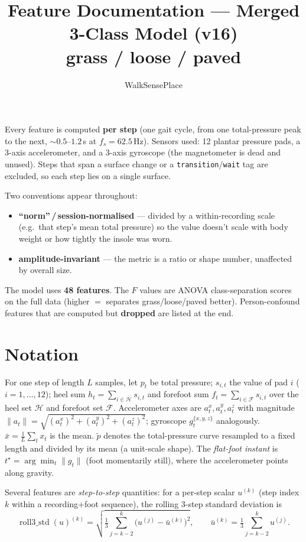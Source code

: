 \documentclass[11pt]{article}
\title{\textbf{Feature Documentation — Merged 3-Class Model (v16)}\\[2pt]
\large grass / loose / paved}
\author{WalkSensePlace}
\date{}
\newcommand{\code}[1]{\texttt{#1}}
\begin{document}
\maketitle

Every feature is computed \textbf{per step} (one gait cycle, from one total-pressure peak to the
next, ${\sim}0.5$–$1.2$\,s at $f_s=62.5$\,Hz). Sensors used: 12 plantar pressure pads, a 3-axis
accelerometer, and a 3-axis gyroscope (the magnetometer is dead and unused). Steps that span a
surface change or a \code{transition}/\code{wait} tag are excluded, so each step lies on a single
surface.

Two conventions appear throughout:
\begin{itemize}
  \item \textbf{``norm''\,/\,session-normalised} --- divided by a within-recording scale (e.g.\ that
  step's mean total pressure) so the value doesn't scale with body weight or how tightly the insole
  was worn.
  \item \textbf{amplitude-invariant} --- the metric is a ratio or shape number, unaffected by
  overall size.
\end{itemize}

The model uses \textbf{48 features}. The $F$ values are ANOVA class-separation scores on the full
data (higher $=$ separates grass/loose/paved better). Person-confound features that are computed
but \textbf{dropped} are listed at the end.

\section*{Notation}
For one step of length $L$ samples, let $p_t$ be total pressure; $s_{i,t}$ the value of pad $i$
($i=1,\dots,12$); heel sum $h_t=\sum_{i\in\mathcal H}s_{i,t}$ and forefoot sum
$f_t=\sum_{i\in\mathcal F}s_{i,t}$ over the heel set $\mathcal H$ and forefoot set $\mathcal F$.
Accelerometer axes are $a^x_t,a^y_t,a^z_t$ with magnitude
$\lVert a_t\rVert=\sqrt{(a^x_t)^2+(a^y_t)^2+(a^z_t)^2}$; gyroscope $g^{\{x,y,z\}}_t$ analogously.
$\bar x=\tfrac1L\sum_t x_t$ is the mean. $\tilde p$ denotes the total-pressure curve resampled to a
fixed length and divided by its mean (a unit-scale shape). The \emph{flat-foot instant} is
$t^\star=\arg\min_t \lVert g_t\rVert$ (foot momentarily still), where the accelerometer points along
gravity.

Several features are \emph{step-to-step} quantities: for a per-step scalar $u^{(k)}$ (step index
$k$ within a recording+foot sequence), the rolling 3-step standard deviation is
\begin{equation}
\operatorname{roll3\_std}(u)^{(k)}=\sqrt{\tfrac{1}{3}\textstyle\sum_{j=k-2}^{k}\bigl(u^{(j)}-\bar u^{(k)}\bigr)^2},
\qquad \bar u^{(k)}=\tfrac13\textstyle\sum_{j=k-2}^{k}u^{(j)}.
\label{eq:roll3}
\end{equation}
\end{document}
